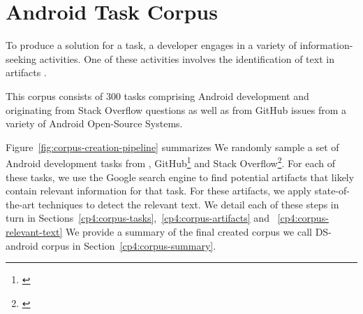 \setcounter{chapter}{3}
\setcounter{rq}{1}


\chapter{Android Task Corpus}
\label{ch:android-corpus}




To produce a solution for a task, a developer engages in a variety of
information-seeking activities.  One of these activities involves
the identification of  text in artifacts .

This corpus consists of 
300 tasks comprising Android development and originating from Stack Overflow questions
as well as from GitHub issues from a variety of Android Open-Source Systems.

Figure~\ref{fig:corpus-creation-pipeline}
summarizes  
We randomly sample a set of Android development tasks from , GitHub\footnote{\url{}} and Stack Overflow\footnote{\url{}}.
For each of these tasks, we use the Google search engine to find potential artifacts that likely contain relevant
information for that task. For these artifacts, we apply state-of-the-art techniques to detect the relevant text.
We detail each of these steps in turn in 
Sections~\ref{cp4:corpus-tasks},~\ref{cp4:corpus-artifacts} and ~\ref{cp4:corpus-relevant-text}
We provide a summary of the final created corpus we call \acs{DS-android} corpus in Section~\ref{cp4:corpus-summary}.



